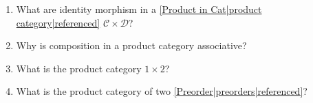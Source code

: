 
\begin{enumerate}
    \item What are identity morphism in a \ref{Product in Cat|product category|referenced} $\mathcal{C}\times \mathcal{D}$?
    \item Why is composition in a product category associative?
    \item What is the product category $1 \times 2$?
    \item What is the product category of two \ref{Preorder|preorders|referenced}?
  \end{enumerate}